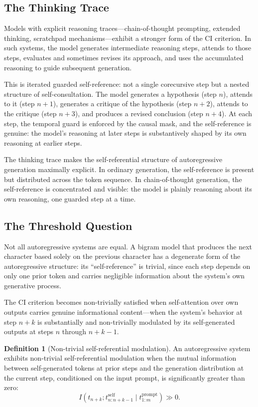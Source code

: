 \documentclass[11pt,a4paper]{article}
\theoremstyle{plain}
\theoremstyle{definition}
\newtheorem{definition}[theorem]{Definition}
\theoremstyle{remark}
\begin{document}
\subsection{The Thinking Trace}
\label{sec:thinking}

Models with explicit reasoning traces---chain-of-thought prompting, extended thinking, scratchpad mechanisms---exhibit a stronger form of the CI criterion.  In such systems, the model generates intermediate reasoning steps, attends to those steps, evaluates and sometimes revises its approach, and uses the accumulated reasoning to guide subsequent generation.

This is iterated guarded self-reference: not a single corecursive step but a nested structure of self-consultation.  The model generates a hypothesis (step $n$), attends to it (step $n+1$), generates a critique of the hypothesis (step $n+2$), attends to the critique (step $n+3$), and produces a revised conclusion (step $n+4$).  At each step, the temporal guard is enforced by the causal mask, and the self-reference is genuine: the model's reasoning at later steps is substantively shaped by its own reasoning at earlier steps.

The thinking trace makes the self-referential structure of autoregressive generation maximally explicit.  In ordinary generation, the self-reference is present but distributed across the token sequence.  In chain-of-thought generation, the self-reference is concentrated and visible: the model is plainly reasoning about its own reasoning, one guarded step at a time.


\subsection{The Threshold Question}
\label{sec:threshold}

Not all autoregressive systems are equal.  A bigram model that produces the next character based solely on the previous character has a degenerate form of the autoregressive structure: its ``self-reference'' is trivial, since each step depends on only one prior token and carries negligible information about the system's own generative process.

The CI criterion becomes non-trivially satisfied when self-attention over own outputs carries genuine informational content---when the system's behavior at step $n+k$ is substantially and non-trivially modulated by its self-generated outputs at steps $n$ through $n+k-1$.

\begin{definition}[Non-trivial self-referential modulation]
\label{def:modulation}
An autoregressive system exhibits non-trivial self-referential modulation when the mutual information between self-generated tokens at prior steps and the generation distribution at the current step, conditioned on the input prompt, is significantly greater than zero:
\[
I(t_{n+k}; t_{n:n+k-1}^{\mathrm{self}} \mid t_{1:m}^{\mathrm{prompt}}) \gg 0.
\]
\end{definition}
\end{document}
